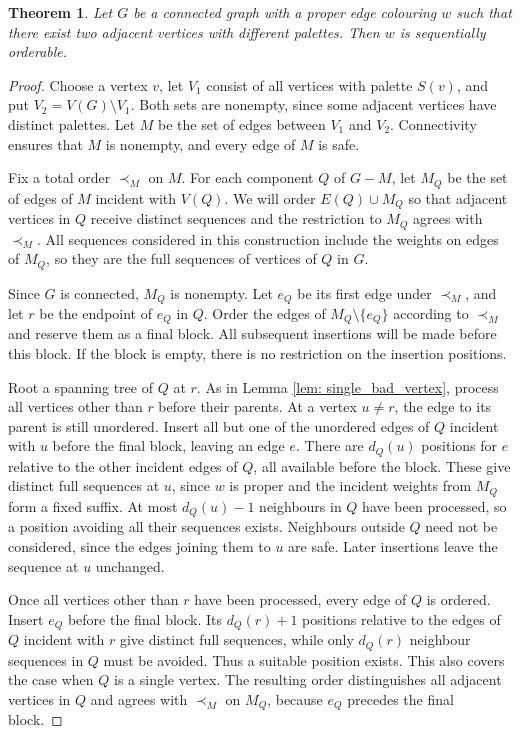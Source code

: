 \documentclass[a4paper,12pt]{elsarticle}
\newtheorem{theorem}{Theorem}
\begin{document}
\begin{theorem} Let $G$ be a connected graph with a proper edge colouring $w$ such that there exist two adjacent vertices with different palettes. Then $w$ is sequentially orderable. \label{thm: safe-edge}
\end{theorem}
\begin{proof}
    Choose a vertex $v$, let $V_1$ consist of all vertices with palette $S(v)$, and put $V_2=V(G)\setminus V_1$. Both sets are nonempty, since some adjacent vertices have distinct palettes. Let $M$ be the set of edges between $V_1$ and $V_2$. Connectivity ensures that $M$ is nonempty, and every edge of $M$ is safe.

    Fix a total order $\prec_M$ on $M$. For each component $Q$ of $G-M$, let $M_Q$ be the set of edges of $M$ incident with $V(Q)$. We will order $E(Q)\cup M_Q$ so that adjacent vertices in $Q$ receive distinct sequences and the restriction to $M_Q$ agrees with $\prec_M$. All sequences considered in this construction include the weights on edges of $M_Q$, so they are the full sequences of vertices of $Q$ in $G$.

    Since $G$ is connected, $M_Q$ is nonempty. Let $e_Q$ be its first edge under $\prec_M$, and let $r$ be the endpoint of $e_Q$ in $Q$. Order the edges of $M_Q\setminus\{e_Q\}$ according to $\prec_M$ and reserve them as a final block. All subsequent insertions will be made before this block. If the block is empty, there is no restriction on the insertion positions.

    Root a spanning tree of $Q$ at $r$. As in Lemma \ref{lem: single_bad_vertex}, process all vertices other than $r$ before their parents. At a vertex $u\neq r$, the edge to its parent is still unordered. Insert all but one of the unordered edges of $Q$ incident with $u$ before the final block, leaving an edge $e$. There are $d_Q(u)$ positions for $e$ relative to the other incident edges of $Q$, all available before the block. These give distinct full sequences at $u$, since $w$ is proper and the incident weights from $M_Q$ form a fixed suffix. At most $d_Q(u)-1$ neighbours in $Q$ have been processed, so a position avoiding all their sequences exists. Neighbours outside $Q$ need not be considered, since the edges joining them to $u$ are safe. Later insertions leave the sequence at $u$ unchanged.

    Once all vertices other than $r$ have been processed, every edge of $Q$ is ordered. Insert $e_Q$ before the final block. Its $d_Q(r)+1$ positions relative to the edges of $Q$ incident with $r$ give distinct full sequences, while only $d_Q(r)$ neighbour sequences in $Q$ must be avoided. Thus a suitable position exists. This also covers the case when $Q$ is a single vertex. The resulting order distinguishes all adjacent vertices in $Q$ and agrees with $\prec_M$ on $M_Q$, because $e_Q$ precedes the final block.


\end{proof}
\end{document}
